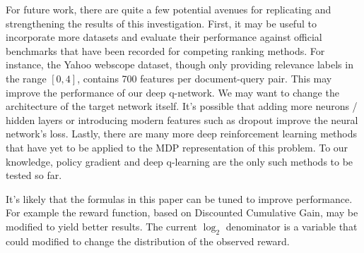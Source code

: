 \documentclass{article}
\begin{document}
For future work, there are quite a few potential avenues for replicating and strengthening the results of this investigation. First, it may be useful to incorporate more datasets and evaluate their performance against official benchmarks that have been recorded for competing ranking methods. For instance, the Yahoo webscope dataset, though only providing relevance labels in the range $[0,4]$, contains 700 features per document-query pair. This may improve the performance of our deep q-network. We may want to change the architecture of the target network itself. It's possible that adding more neurons / hidden layers or introducing modern features such as dropout improve the neural network's loss. 
Lastly, there are many more deep reinforcement learning methods that have yet to be applied to the MDP representation of this problem. To our knowledge, policy gradient and deep q-learning are the only such methods to be tested so far.

It's likely that the formulas in this paper can be tuned to improve performance. For example the reward function, based on Discounted Cumulative Gain, may be modified to yield better results. The current $\log_2$ denominator is a variable that could modified to change the distribution of the observed reward. 


  
\end{document}
